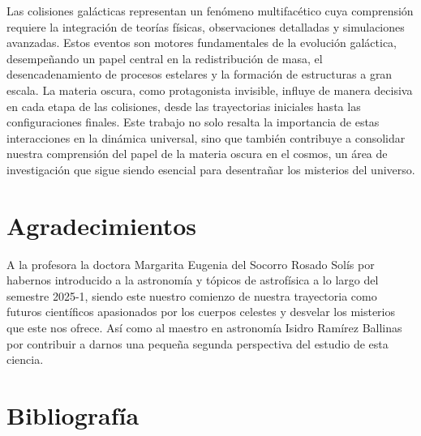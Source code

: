 \documentclass{article}
\begin{document}
Las colisiones galácticas representan un fenómeno multifacético cuya comprensión requiere la integración de teorías físicas, observaciones detalladas y simulaciones avanzadas. Estos eventos son motores fundamentales de la evolución galáctica, desempeñando un papel central en la redistribución de masa, el desencadenamiento de procesos estelares y la formación de estructuras a gran escala. La materia oscura, como protagonista invisible, influye de manera decisiva en cada etapa de las colisiones, desde las trayectorias iniciales hasta las configuraciones finales. Este trabajo no solo resalta la importancia de estas interacciones en la dinámica universal, sino que también contribuye a consolidar nuestra comprensión del papel de la materia oscura en el cosmos, un área de investigación que sigue siendo esencial para desentrañar los misterios del universo.  \\

\section*{Agradecimientos}

A la profesora la doctora Margarita Eugenia del Socorro Rosado Solís por habernos introducido a la astronomía y tópicos de astrofísica a lo largo del semestre 2025-1, siendo este nuestro comienzo de nuestra trayectoria como futuros científicos apasionados por los cuerpos celestes y desvelar los misterios que este nos ofrece. Así como al maestro en astronomía Isidro Ramírez Ballinas por contribuir a darnos una pequeña segunda perspectiva del estudio de esta ciencia.

\section*{Bibliografía}
\end{document}
